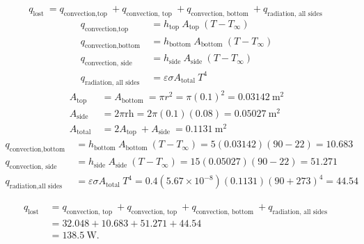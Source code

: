 \documentclass{zc-ust-hw}
\begin{document}
\begin{enumerate}
    \begin{sol}
      \begin{equation}
      q_{\text {lost }}=q_{\text {convection,top }}+q_{\text {convection, top }}+q_{\text {convection, bottom }}+q_{\text {radiation, all sides }}
      \end{equation}
      \begin{align}
        q_{\text {convection,top }} & =h_{\text {top }} A_{\text {top }}\left(T-T_{\infty}\right) \\
        q_{\text {convection,bottom }} & =h_{\text {bottom }} A_{\text {bottom }}\left(T-T_{\infty}\right) \\
        q_{\text {convection, side }} & =h_{\text {side }} A_{\text {side }}\left(T-T_{\infty}\right) \\
        q_{\text {radiation, all sides }} & =\varepsilon \sigma A_{\text {total }} T^4
      \end{align}
      \begin{align}
        A_{\text {top }} & =A_{\text {bottom }}=\pi r^2=\pi(0.1)^2=0.03142 \mathrm{~m}^2 \\
        A_{\text {side }} & =2 \pi \mathrm{rh}=2 \pi(0.1)(0.08)=0.05027 \mathrm{~m}^2 \\
        A_{\text {total }} & =2 A_{\text {top }}+A_{\text {side }}=0.1131 \mathrm{~m}^2
      \end{align}
      \begin{align}
        q_{\text {convection,bottom }} & =h_{\text {bottom }} A_{\text {bottom }}\left(T-T_{\infty}\right)=5(0.03142)(90-22)=10.683 \\
        q_{\text {convection, side }} & =h_{\text {side }} A_{\text {side }}\left(T-T_{\infty}\right)=15(0.05027)(90-22)=51.271 \\
        q_{\text {radiation,all sides }} & =\varepsilon \sigma A_{\text {total }} T^4=0.4\left(5.67 \times 10^{-8}\right)(0.1131)(90+273)^4=44.54
      \end{align}

      \begin{align}
        q_{\text {lost }} & =q_{\text {convection, top }}+q_{\text {convection, top }}+q_{\text {convection, bottom }}+q_{\text {radiation, all sides }} \\
                          & =32.048+10.683+51.271+44.54 \\
                          & =138.5 \mathrm{~W}
      .\end{align}
    \end{sol}


\end{enumerate}
\end{document}
